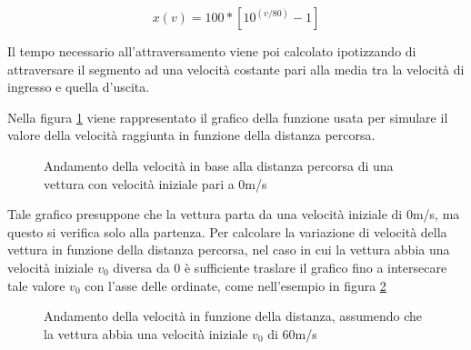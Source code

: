 \documentclass[a4paper,11pt, twoside]{book}
\begin{document}
	$$x(v)=100*[10^{(v/80)}-1]$$
	
	Il tempo necessario all'attraversamento viene poi calcolato ipotizzando di attraversare il segmento ad una velocità
	costante pari alla media tra la velocità di ingresso e quella d'uscita.
		
	Nella figura \ref{fgr:GraficoVelocita} viene rappresentato il grafico della funzione usata per simulare il valore
	della velocità raggiunta in funzione della distanza percorsa.
	
	\begin{figure}[h]
	  \centering
	  \caption{Andamento della velocità in base alla distanza percorsa di una vettura con velocità iniziale
		    pari a 0m/s}
	  \label{fgr:GraficoVelocita}
	\end{figure}
	
	Tale grafico presuppone che la vettura parta da una velocità iniziale di 0m/s, ma questo si verifica solo 
	alla partenza.
	Per calcolare la variazione di velocità della vettura in funzione della distanza percorsa, nel caso in cui la vettura
	abbia una velocità iniziale $v_0$ diversa da 0 è sufficiente traslare il grafico fino a intersecare tale valore $v_0$
	con l'asse delle ordinate, come nell'esempio in figura \ref{fgr:GraficoVelocitaTraslato}
	
	\begin{figure}[h]
	  \centering
	  \caption{Andamento della velocità in funzione della distanza, assumendo che la vettura abbia una
		    velocità iniziale $v_0$ di 60m/s}
	  \label{fgr:GraficoVelocitaTraslato}

	\end{figure}
\end{document}
